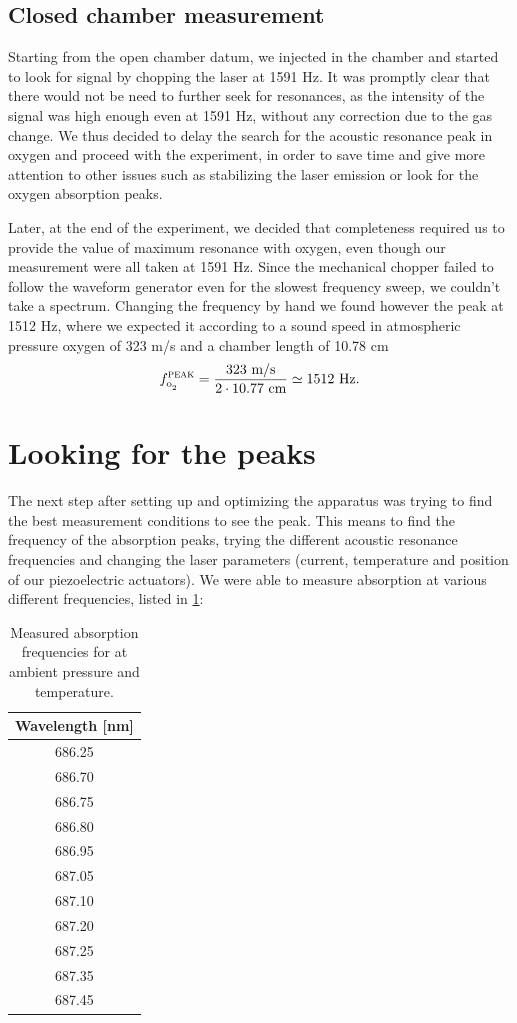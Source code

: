 		\subsection{Closed chamber measurement}
Starting from the open chamber datum, we injected  in the chamber and started to look for signal by chopping the laser at 1591 Hz. It was promptly clear that there would not be need to further seek for resonances, as the intensity of the signal was high enough even at 1591 Hz, without any correction due to the gas change. We thus decided to delay the search for the acoustic resonance peak in oxygen and proceed with the experiment, in order to save time and give more attention to other issues such as stabilizing the laser emission or look for the oxygen absorption peaks.

Later, at the end of the experiment, we decided that completeness required us to provide the value of maximum resonance with oxygen, even though our measurement were all taken at 1591 Hz. Since the mechanical chopper failed to follow the waveform generator even for the slowest frequency sweep, we couldn't take a spectrum. Changing the frequency by hand we found however the peak at 1512 Hz, where we expected it according to a sound speed in atmospheric pressure oxygen of 323 m/s and a chamber length of 10.78 cm$$f^{\mai{peak}}_{\ce{o2}}=\frac{323\mbox{ m/s}}{2\cdot10.77\mbox{ cm}}\simeq1512\mbox{ Hz.}$$

\section{Looking for the \texorpdfstring{}{oxygen} peaks}\label{oxygen}
The next step after setting up and optimizing the apparatus was trying to find the best measurement conditions to see the peak. This means to find the frequency of the  absorption peaks, trying the different acoustic resonance frequencies and changing the laser parameters (current, temperature and position of our piezoelectric actuators). 
We were able to measure absorption at various different frequencies, listed in \cref{oxypeaks}:

\begin{table}\centering
\begin{tabular}{|c|}
\hline Wavelength [nm]\\ \hline
686.25 \\ \hline
686.70 \\ \hline
686.75 \\ \hline
686.80 \\ \hline
686.95 \\ \hline
687.05 \\ \hline
687.10 \\ \hline
687.20 \\ \hline
687.25 \\ \hline
687.35 \\ \hline
687.45 \\ \hline
\end{tabular}
\caption{Measured absorption frequencies for  at ambient pressure and temperature.}
\label{oxypeaks}
\end{table}

